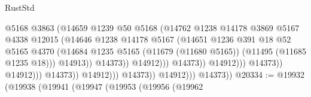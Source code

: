 \begin{lexlean}{RustStd}
\begin{coremodule}
                                                      @5168
                                                      @3863
                                                      (@14659
                                                        @1239
                                                        @50
                                                        @5168
                                                        (@14762
                                                          @1238
                                                          @14178
                                                          @3869
                                                          @5167
                                                          @4338
                                                          @12015
                                                          (@14646
                                                            @1238
                                                            @14178
                                                            @5167
                                                            (@14651
                                                              @1236
                                                              @391
                                                              @18
                                                              @52
                                                              @5165
                                                              @4370
                                                              (@14684
                                                                @1235
                                                                @5165
                                                                (@11679 (@11680 @5165))
                                                                (@11495 (@11685 @1235 @18)))
                                                              @14913))
                                                          @14373))
                                                      @14912)))
                                                @14373))
                                            @14912)))
                                      @14373))
                                  @14912)))
                            @14373))
                        @14912)))
                  @14373))
              @14912)))
        @14373))
@20334 := @19932
    (@19938
      (@19941
        (@19947
          (@19953
            (@19956
              (@19962

\end{coremodule}
\end{lexlean}
